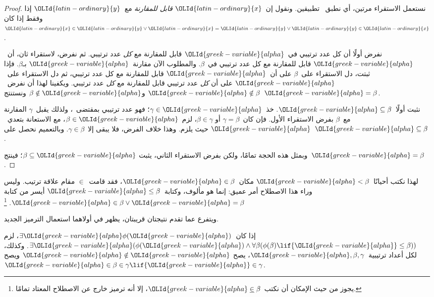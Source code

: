 \documentclass[../../../include/open-logic-section]{subfiles}
\begin{document}
\begin{proof}
نستعمل الاستقراء مرتين، أي نطبق~ تطبيقين.
ونقول إن~${\OLId{latin-ordinary}{x}}$ \emph{قابل للمقارنة} مع~${\OLId{latin-ordinary}{y}}$ إذا وفقط إذا كان
${\OLId{latin-ordinary}{x}} \in {\OLId{latin-ordinary}{y}} \lor {\OLId{latin-ordinary}{x}} = {\OLId{latin-ordinary}{y}} \lor {\OLId{latin-ordinary}{y}} \in {\OLId{latin-ordinary}{x}}$.

نفرض أولًا أن كل عدد ترتيبي في~${\OLId{greek-variable}{alpha}}$ قابل للمقارنة مع \emph{كل}
عدد ترتيبي. ثم نفرض، لاستقراء ثان، أن~${\OLId{greek-variable}{alpha}}$ قابل للمقارنة مع كل
عدد ترتيبي في~$\beta$. والمطلوب الآن مقارنة~${\OLId{greek-variable}{alpha}}$ بـ$\beta$.
فإذا ثبتت، دل الاستقراء على~$\beta$ على أن~${\OLId{greek-variable}{alpha}}$ قابل للمقارنة
مع كل عدد ترتيبي، ثم دل الاستقراء على~${\OLId{greek-variable}{alpha}}$ على أن \emph{كل}
عدد ترتيبي قابل للمقارنة مع \emph{كل} عدد ترتيبي. ويكفينا لهذا أن
نفرض~${\OLId{greek-variable}{alpha}} \notin \beta$ و$\beta \notin {\OLId{greek-variable}{alpha}}$ ونستنتج~${\OLId{greek-variable}{alpha}} = \beta$.

نثبت أولًا~${\OLId{greek-variable}{alpha}} \subseteq \beta$. خذ~$\gamma \in {\OLId{greek-variable}{alpha}}$؛ فهو
عدد ترتيبي بمقتضى~، ولذلك يقبل~$\gamma$ المقارنة
مع~$\beta$ بفرض الاستقراء الأول. فإن كان~$\gamma = \beta$ أو
$\beta \in \gamma$، لزم~$\beta \in {\OLId{greek-variable}{alpha}}$، مع الاستعانة بتعدي~${\OLId{greek-variable}{alpha}}$
حيث يلزم. وهذا خلاف الفرض، فلا يبقى إلا~$\gamma \in \beta$.
وبالتعميم نحصل على~${\OLId{greek-variable}{alpha}} \subseteq \beta$.

وبمثل هذه الحجة تمامًا، ولكن بفرض الاستقراء الثاني، يثبت
$\beta \subseteq {\OLId{greek-variable}{alpha}}$؛ فينتج~${\OLId{greek-variable}{alpha}} = \beta$.
\end{proof}\noindent
لهذا نكتب أحيانًا~${\OLId{greek-variable}{alpha}} <\beta$ مكان~${\OLId{greek-variable}{alpha}} \in \beta$، فقد
قامت~$\in$ مقام علاقة ترتيب. وليس وراء هذا الاصطلاح أمر عميق:
إنما هو مألوف، وكتابة~${\OLId{greek-variable}{alpha}} \leq \beta$ أيسر من كتابة
${\OLId{greek-variable}{alpha}} \in \beta \lor {\OLId{greek-variable}{alpha}} = \beta$.
\footnote{يجوز من حيث الإمكان أن نكتب~${\OLId{greek-variable}{alpha}} \mathrel{\underline{\in}} \beta$،
إلا أنه ترميز خارج عن الاصطلاح المعتاد تمامًا.}

ويتفرع عما تقدم نتيجتان قريبتان، يظهر في أولاهما استعمال الترميز الجديد.

\begin{cor}
إذا كان~$\exists {\OLId{greek-variable}{alpha}}\phi({\OLId{greek-variable}{alpha}})$، لزم
$\exists {\OLId{greek-variable}{alpha}}(\phi({\OLId{greek-variable}{alpha}}) \land \forall \beta(\phi(\beta) \lif {\OLId{greek-variable}{alpha}} \leq \beta))$.
وكذلك، لكل أعداد ترتيبية~${\OLId{greek-variable}{alpha}}, \beta, \gamma$، يصح
${\OLId{greek-variable}{alpha}} \notin {\OLId{greek-variable}{alpha}}$ ويصح~${\OLId{greek-variable}{alpha}} \in \beta \in \gamma \lif {\OLId{greek-variable}{alpha}} \in \gamma$.
\end{cor}
\end{document}
